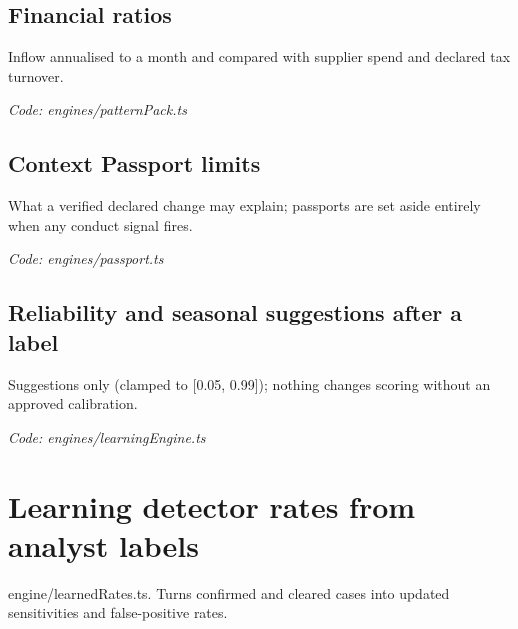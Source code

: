 \documentclass[11pt,a4paper]{article}
\newcommand{\where}[1]{\par{\small\itshape\color{mute}Code: #1}\par}
\begin{document}
\subsection*{Financial ratios}
\par\smallskip\noindent{}\par\smallskip
Inflow annualised to a month and compared with supplier spend and declared tax turnover.
\where{engines/patternPack.ts}

\subsection*{Context Passport limits}
\par\smallskip\noindent{}\par\smallskip
What a verified declared change may explain; passports are set aside entirely when any conduct signal fires.
\where{engines/passport.ts}

\subsection*{Reliability and seasonal suggestions after a label}
\par\smallskip\noindent{}\par\smallskip
\par\smallskip\noindent{}\par\smallskip
Suggestions only (clamped to [0.05, 0.99]); nothing changes scoring without an approved calibration.
\where{engines/learningEngine.ts}

\clearpage
\section{Learning detector rates from analyst labels}
{\color{mute}engine/learnedRates.ts. Turns confirmed and cleared cases into updated sensitivities and false-positive rates.}
\end{document}
